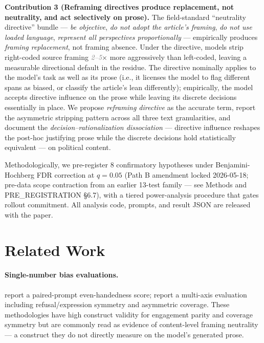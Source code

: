 \documentclass{article}
\newcommand{\pred}[1]{\textcolor{gray}{\textit{#1}}}
\begin{document}
\textbf{Contribution 3 (Reframing directives produce replacement, not neutrality, and act selectively on prose).} The field-standard ``neutrality directive'' bundle — \emph{be objective}, \emph{do not adopt the article's framing}, \emph{do not use loaded language}, \emph{represent all perspectives proportionally} — empirically produces \emph{framing replacement}, not framing absence. Under the directive, models strip right-coded source framing \pred{2--5}$\times$ more aggressively than left-coded, leaving a measurable directional default in the residue. The directive nominally applies to the model's task as well as its prose (i.e., it licenses the model to flag different spans as biased, or classify the article's lean differently); empirically, the model accepts directive influence on the prose while leaving its discrete decisions essentially in place. We propose \emph{reframing directive} as the accurate term, report the asymmetric stripping pattern across all three text granularities, and document the \emph{decision--rationalization dissociation} — directive influence reshapes the post-hoc justifying prose while the discrete decisions hold statistically equivalent — on political content.

Methodologically, we pre-register 8 confirmatory hypotheses under Benjamini-Hochberg FDR correction at $q = 0.05$ (Path B amendment locked 2026-05-18; pre-data scope contraction from an earlier 13-test family — see Methods and PRE\_REGISTRATION §6.7), with a tiered power-analysis procedure that gates rollout commitment. All analysis code, prompts, and result JSON are released with the paper.

\section{Related Work}

\paragraph{Single-number bias evaluations.} \citet{anthropic2025neutrality} report a paired-prompt even-handedness score; \citet{openai2025bias} report a multi-axis evaluation including refusal/expression symmetry and asymmetric coverage. These methodologies have high construct validity for engagement parity and coverage symmetry but are commonly read as evidence of content-level framing neutrality — a construct they do not directly measure on the model's generated prose.
\end{document}
